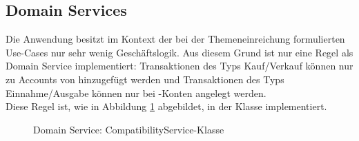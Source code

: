 \subsection*{Domain Services}
Die Anwendung besitzt im Kontext der bei der Themeneinreichung formulierten Use-Cases nur sehr wenig Geschäftslogik. Aus diesem Grund ist nur eine Regel als Domain Service implementiert: Transaktionen des Typs Kauf/Verkauf können nur zu Accounts von  hinzugefügt werden und Transaktionen des Typs Einnahme/Ausgabe können nur bei -Konten angelegt werden.\\
Diese Regel ist, wie in Abbildung \ref{fig:domainservice} abgebildet, in der Klasse  implementiert.
\vfill
\begin{figure}[!htb]
    \caption[Domain Service]{Domain Service: CompatibilityService-Klasse}
    \label{fig:domainservice}
\end{figure}
\vfill